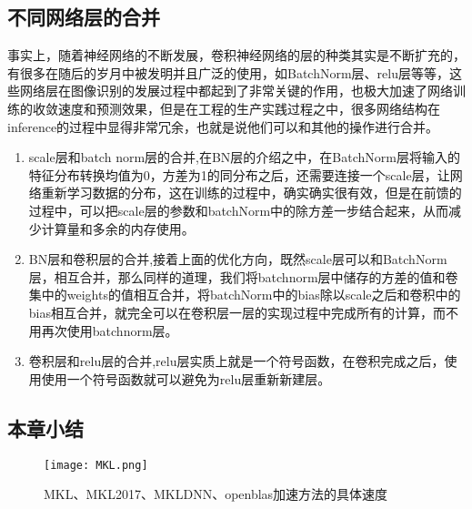 \subsection{不同网络层的合并}
事实上，随着神经网络的不断发展，卷积神经网络的层的种类其实是不断扩充的，有很多在随后的岁月中被发明并且广泛的使用，如BatchNorm层、relu层等等，这些网络层在图像识别的发展过程中都起到了非常关键的作用，也极大加速了网络训练的收敛速度和预测效果，但是在工程的生产实践过程之中，很多网络结构在inference的过程中显得非常冗余，也就是说他们可以和其他的操作进行合并。
\begin{enumerate}
\item scale层和batch norm层的合并,在BN层的介绍之中，在BatchNorm层将输入的特征分布转换均值为0，方差为1的同分布之后，还需要连接一个scale层，让网络重新学习数据的分布，这在训练的过程中，确实确实很有效，但是在前馈的过程中，可以把scale层的参数和batchNorm中的除方差一步结合起来，从而减少计算量和多余的内存使用。
\item BN层和卷积层的合并,接着上面的优化方向，既然scale层可以和BatchNorm层，相互合并，那么同样的道理，我们将batchnorm层中储存的方差的值和卷集中的weights的值相互合并，将batchNorm中的bias除以scale之后和卷积中的bias相互合并，就完全可以在卷积层一层的实现过程中完成所有的计算，而不用再次使用batchnorm层。
\item 卷积层和relu层的合并,relu层实质上就是一个符号函数，在卷积完成之后，使用使用一个符号函数就可以避免为relu层重新新建层。
\end{enumerate}

\subsection{本章小结}
\begin{figure}[!ht]
 \centering
	\texttt{[image: MKL.png]}
	\caption{MKL、MKL2017、MKLDNN、openblas加速方法的具体速度}
\end{figure}






